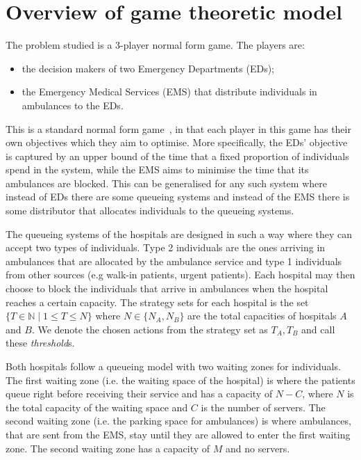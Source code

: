 \section{Overview of game theoretic model} \label{sec:model_overview}

The problem studied is a 3-player normal form game. The players are:
  
\begin{itemize}
    \item the decision makers of two Emergency Departments (EDs);
    \item the Emergency Medical Services (EMS) that distribute individuals in ambulances to the EDs.
\end{itemize}

This is a standard normal form game~\cite{Maschler2013},  
in that each player in this game has their own objectives which they aim to 
optimise.
More specifically, the EDs' objective is captured by an upper bound
of the time that a fixed proportion of individuals spend in the system, 
while the EMS aims to minimise the time that its ambulances 
are blocked.
This can be generalised for any such system where instead of EDs there are some
queueing systems and instead of the EMS there is some distributor that allocates individuals to the queueing systems. 

The queueing systems of the hospitals are designed in such a way where they can
accept two types
of individuals. 
Type 2 individuals are the ones arriving in ambulances that are allocated by
the ambulance service and 
type 1 individuals from other sources (e.g walk-in patients, urgent patients).
Each hospital may then choose to block the individuals that arrive in
ambulances when the hospital reaches a certain capacity. 
The strategy sets for each hospital is the set 
\( \{T \in \mathbb{N} \;|\; 1 \leq T \leq N\} \) where \(N \in\{N_A, N_B\}\) are 
the total capacities of hospitals \(A\) and \(B\). We denote the chosen actions 
from the strategy set as \(T_A, T_B\) and call these \textit{threshold}s.

Both hospitals follow a queueing model with two waiting zones for 
individuals. 
The first waiting zone (i.e. the waiting space of the hospital) is where the 
patients queue right before receiving 
their service and has a capacity of \( N - C \), where \(N\) is the total 
capacity of the waiting space and \(C\) is the number of servers. 
The second waiting zone (i.e. the parking space for ambulances) is where 
ambulances, that are sent from the
EMS, stay until they are allowed to enter the first waiting zone.
The second waiting zone has a capacity of \(M\) and no servers.

